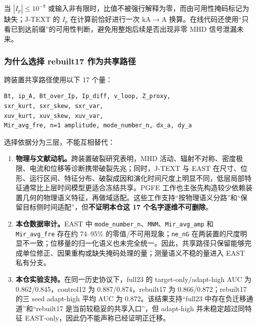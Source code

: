 \documentclass[11pt,a4paper]{article}
\newcommand{\code}[1]{\texttt{\small #1}}
\begin{document}
当 \(|I_p|\leq10^{-9}\) 或输入非有限时，比值不被强行解释为零，而由可用性掩码标记为缺失；J-TEXT 的 \(I_p\) 在计算前恰好进行一次 \(\mathrm{kA}\rightarrow\mathrm{A}\) 换算。在线代码还使用“只看已到达前缀”的可用性判断，避免用整炮后续是否出现非零 MHD 信号泄漏未来。

\subsubsection{为什么选择 rebuilt17 作为共享路径}

跨装置共享路径使用以下 17 个量：

\begin{lstlisting}
Bt, ip_A, Bt_over_Ip, Ip_diff, v_loop, Z_proxy,
sxr_kurt, sxr_skew, sxr_var,
xuv_kurt, xuv_skew, xuv_var,
Mir_avg_fre, n=1 amplitude, mode_number_n, dx_a, dy_a
\end{lstlisting}

选择依据分为三层，不能互相替代：

\begin{enumerate}
\item \textbf{物理与文献动机。}跨装置破裂研究表明，MHD 活动、辐射不对称、密度极限、电流和位移等诊断携带破裂先兆；同时，J-TEXT 与 EAST 在尺寸、位形、运行区间、特征分布、破裂成因和演化时间尺度上明显不同，低层局部特征通常比上层时间模型更适合冻结共享\cite{zheng2023transfer}。PGFE 工作也主张先构造较少依赖装置几何的物理语义特征，再做域适配\cite{xue2023pgfe}。这些工作支持“按物理语义分路”和“保留目标侧时间适配”，但\textbf{不证明本仓这 17 个名字逐维不可删除}。
\item \textbf{本仓数据审计。}EAST 中 \code{mode\_number\_n}、\code{MNM}、\code{Mir\_avg\_amp} 和 \code{Mir\_avg\_fre} 存在约 74--95\% 的零值/不可用现象；\code{ne\_nG} 在两装置的尺度明显不一致；位移量的归一化语义也未完全统一。因此，共享路径只保留能够完成单位修正、因果重构或缺失掩码处理的量；测量语义不稳的量进入 EAST 私有分支。
\item \textbf{本仓实验支持。}在同一历史协议下，full23 的 target-only/adapt-high AUC 为 0.862/0.845，control12 为 0.887/0.874，rebuilt17 为 0.866/0.872；rebuilt17 的三 seed adapt-high 平均 AUC 为 0.872。该结果支持“full23 中存在负迁移通道”和“rebuilt17 是当前较稳妥的共享入口”，但 adapt-high 并未稳定超过同特征 EAST-only，因此仍不能声称已经证明正迁移。
\end{enumerate}
\end{document}
